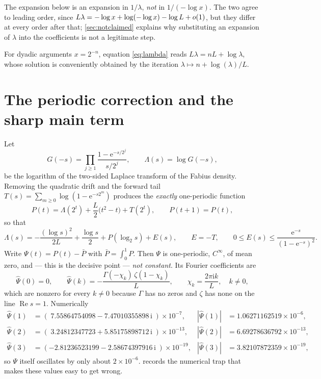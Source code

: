 \documentclass[11pt,oneside]{article}
\theoremstyle{definition}
\theoremstyle{remark}
\newcommand{\e}{\mathrm e}
\newcommand{\ii}{\mathrm i}
\newcommand{\Psihat}{\widehat\Psi}
\begin{document}
The expansion below is an expansion in $1/\lambda$, \emph{not} in $1/(-\log x)$.
The two agree to leading order, since
$L\lambda=-\log x+\log(-\log x)-\log L+\smash{o(1)}$, but they differ at every
order after that; \cref{sec:notclaimed} explains why substituting an expansion
of $\lambda$ into the coefficients is not a legitimate step.

For dyadic arguments $x=2^{-n}$, equation \cref{eq:lambda} reads
$L\lambda=nL+\log\lambda$, whose solution is conveniently obtained by the
iteration $\lambda\mapsto n+\log(\lambda)/L$.

\section{The periodic correction and the sharp main term}\label{sec:main}

Let
\[
  G(-s)=\prod_{j\ge1}\frac{1-\e^{-s/2^j}}{s/2^j},
  \qquad \Lambda(s)=\log G(-s),
\]
be the logarithm of the two-sided Laplace transform of the Fabius density.
Removing the quadratic drift and the forward tail
$T(s)=\sum_{m\ge0}\log(1-\e^{-s2^m})$ produces the \emph{exactly} one-periodic
function
\[
  P(t)=\Lambda(2^t)+\frac L2\bigl(t^2-t\bigr)+T(2^t),
  \qquad P(t+1)=P(t),
\]
so that
\[
  \Lambda(s)=-\frac{(\log s)^2}{2L}+\frac{\log s}{2}+P(\log_2s)+E(s),
  \qquad E=-T,\qquad
  0\le E(s)\le\frac{\e^{-s}}{(1-\e^{-s})^2}.
\]
Write $\Psi(t)=P(t)-\bar P$ with $\bar P=\int_0^1P$.  Then $\Psi$ is
one-periodic, $C^\infty$, of mean zero, and --- this is the decisive point ---
\emph{not constant}.  Its Fourier coefficients are
\begin{equation}\label{eq:psihat}
  \Psihat(0)=0,\qquad
  \Psihat(k)=-\frac{\Gamma(-\chi_k)\,\zeta(1-\chi_k)}{L},
  \qquad \chi_k=\frac{2\pi\ii k}{L},\quad k\ne0,
\end{equation}
which are nonzero for every $k\ne0$ because $\Gamma$ has no zeros and $\zeta$
has none on the line $\operatorname{Re}s=1$.  Numerically
\[
\begin{aligned}
  \Psihat(1)&=(\;7.55864754098-7.47010355898\,\ii\;)\times10^{-7},
    &|\Psihat(1)|&=1.06271162519\times10^{-6},\\
  \Psihat(2)&=(\;3.24812347723+5.85175898712\,\ii\;)\times10^{-13},
    &|\Psihat(2)|&=6.69278636792\times10^{-13},\\
  \Psihat(3)&=(-2.81236523199-2.58674397916\,\ii\;)\times10^{-19},
    &|\Psihat(3)|&=3.82107872359\times10^{-19},
\end{aligned}
\]
so $\Psi$ itself oscillates by only about $2\times10^{-6}$.  
records the numerical trap that makes these values easy to get wrong.
\end{document}
